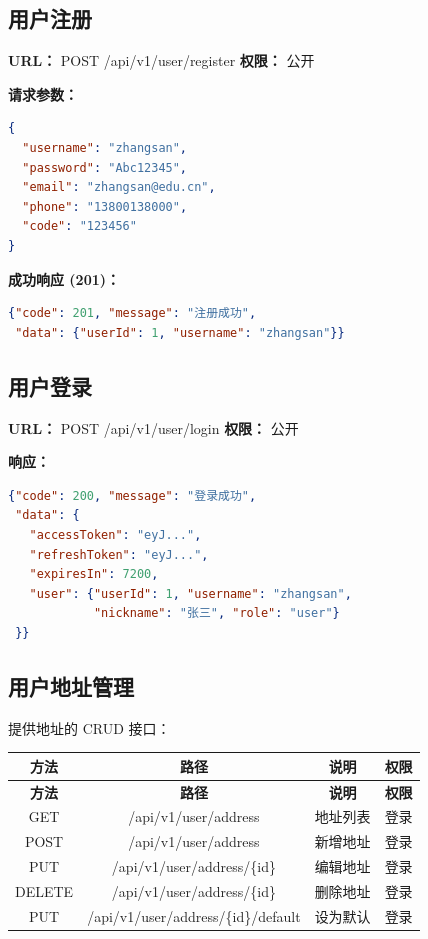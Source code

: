 \documentclass[12pt,a4paper,UTF8]{ctexart}
\begin{document}
\subsection{用户注册}

\textbf{URL：} POST /api/v1/user/register \hfill \textbf{权限：} 公开

\textbf{请求参数：}

\begin{lstlisting}[language=json,breaklines=true]
{
  "username": "zhangsan",
  "password": "Abc12345",
  "email": "zhangsan@edu.cn",
  "phone": "13800138000",
  "code": "123456"
}
\end{lstlisting}

\textbf{成功响应 (201)：}

\begin{lstlisting}[language=json,breaklines=true]
{"code": 201, "message": "注册成功",
 "data": {"userId": 1, "username": "zhangsan"}}
\end{lstlisting}

\subsection{用户登录}

\textbf{URL：} POST /api/v1/user/login \hfill \textbf{权限：} 公开

\textbf{响应：}

\begin{lstlisting}[language=json,breaklines=true]
{"code": 200, "message": "登录成功",
 "data": {
   "accessToken": "eyJ...",
   "refreshToken": "eyJ...",
   "expiresIn": 7200,
   "user": {"userId": 1, "username": "zhangsan",
            "nickname": "张三", "role": "user"}
 }}
\end{lstlisting}

\subsection{用户地址管理}

提供地址的 CRUD 接口：

\begin{longtable}{|c|c|c|c|}
    \hline
    \textbf{方法} & \textbf{路径} & \textbf{说明} & \textbf{权限} \\
    \hline
    \endfirsthead
    \hline
    \textbf{方法} & \textbf{路径} & \textbf{说明} & \textbf{权限} \\
    \hline
    \endhead
    \hline
    \endfoot

    GET & /api/v1/user/address & 地址列表 & 登录 \\
    \hline
    POST & /api/v1/user/address & 新增地址 & 登录 \\
    \hline
    PUT & /api/v1/user/address/\{id\} & 编辑地址 & 登录 \\
    \hline
    DELETE & /api/v1/user/address/\{id\} & 删除地址 & 登录 \\
    \hline
    PUT & /api/v1/user/address/\{id\}/default & 设为默认 & 登录 \\
    \hline
\end{longtable}
\end{document}
